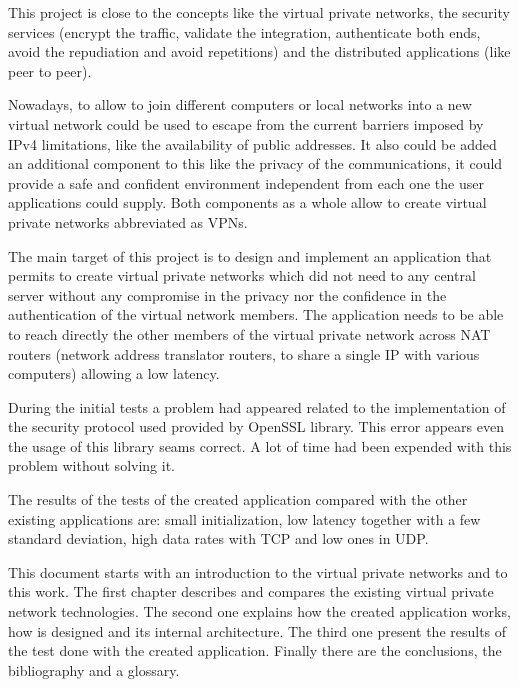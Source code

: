 \begin{overview}{4.7cm}
This project is close to the concepts like the virtual private networks, the security services (encrypt the traffic, validate the integration, authenticate both ends, avoid the repudiation and avoid repetitions) and the distributed applications (like peer to peer).

Nowadays, to allow to join different computers or local networks into a new virtual network could be used to escape from the current barriers imposed by IPv4 limitations, like the availability of public addresses. It also could be added an additional component to this like the privacy of the communications, it could provide a safe and confident environment independent from each one the user applications could supply. Both components as a whole allow to create virtual private networks abbreviated as VPNs.

The main target of this project is to design and implement an application that permits to create virtual private networks which did not need to any central server without any compromise in the privacy nor the confidence in the authentication of the virtual network members.
The application needs to be able to reach directly the other members of the virtual private network across NAT routers (network address translator routers, to share a single IP with various computers) allowing a low latency.

During the initial tests a problem had appeared related to the implementation of the security protocol used provided by OpenSSL library. This error appears even the usage of this library seams correct. A lot of time had been expended with this problem without solving it.

The results of the tests of the created application compared with the other existing applications are: small initialization, low latency together with a few standard deviation, high data rates with TCP and low ones in UDP.

This document starts with an introduction to the virtual private networks and to this work.
The first chapter describes and compares the existing virtual private network technologies.
The second one explains how the created application works, how is designed and its internal architecture.
The third one present the results of the test done with the created application.
Finally there are the conclusions, the bibliography and a glossary.
\end{overview}

